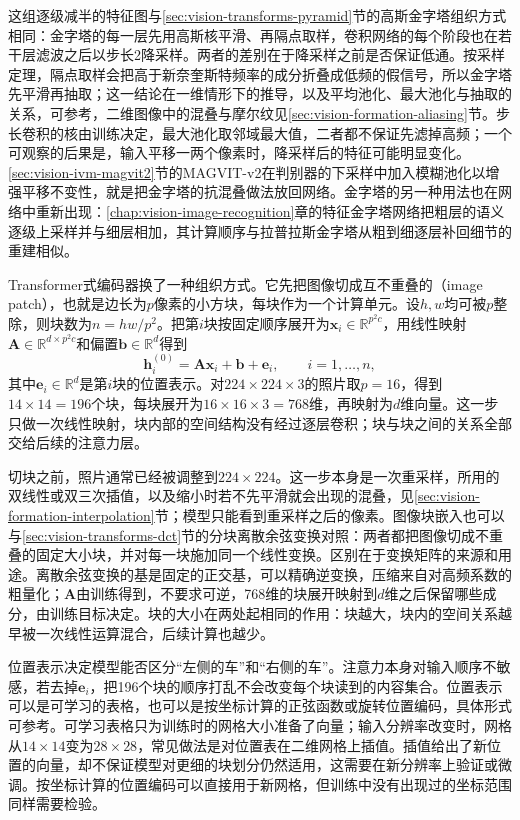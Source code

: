 这组逐级减半的特征图与\ref{sec:vision-transforms-pyramid}节的高斯金字塔组织方式相同：金字塔的每一层先用高斯核平滑、再隔点取样，卷积网络的每个阶段也在若干层滤波之后以步长2降采样。两者的差别在于降采样之前是否保证低通。按采样定理，隔点取样会把高于新奈奎斯特频率的成分折叠成低频的假信号，所以金字塔先平滑再抽取；这一结论在一维情形下的推导，以及平均池化、最大池化与抽取的关系，可参考，二维图像中的混叠与摩尔纹见\ref{sec:vision-formation-aliasing}节。步长卷积的核由训练决定，最大池化取邻域最大值，二者都不保证先滤掉高频；一个可观察的后果是，输入平移一两个像素时，降采样后的特征可能明显变化。\ref{sec:vision-ivm-magvit2}节的MAGVIT-v2在判别器的下采样中加入模糊池化以增强平移不变性，就是把金字塔的抗混叠做法放回网络。金字塔的另一种用法也在网络中重新出现：\ref{chap:vision-image-recognition}章的特征金字塔网络把粗层的语义逐级上采样并与细层相加，其计算顺序与拉普拉斯金字塔从粗到细逐层补回细节的重建相似。

Transformer式编码器换了一种组织方式。它先把图像切成互不重叠的（image patch），也就是边长为$p$像素的小方块，每块作为一个计算单元。设$h,w$均可被$p$整除，则块数为$n=hw/p^2$。把第$i$块按固定顺序展开为$\bm x_i\in\mathbb R^{p^2c}$，用线性映射$\bm A\in\mathbb R^{d\times p^2c}$和偏置$\bm b\in\mathbb R^{d}$得到
\begin{equation}
  \bm h_i^{(0)}=\bm A\bm x_i+\bm b+\bm e_i,
  \qquad i=1,\ldots,n,
  \label{eq:vision-ivm-patch-embedding}
\end{equation}
其中$\bm e_i\in\mathbb R^{d}$是第$i$块的位置表示。对$224\times224\times3$的照片取$p=16$，得到$14\times14=196$个块，每块展开为$16\times16\times3=768$维，再映射为$d$维向量。这一步只做一次线性映射，块内部的空间结构没有经过逐层卷积；块与块之间的关系全部交给后续的注意力层。

切块之前，照片通常已经被调整到$224\times224$。这一步本身是一次重采样，所用的双线性或双三次插值，以及缩小时若不先平滑就会出现的混叠，见\ref{sec:vision-formation-interpolation}节；模型只能看到重采样之后的像素。图像块嵌入也可以与\ref{sec:vision-transforms-dct}节的分块离散余弦变换对照：两者都把图像切成不重叠的固定大小块，并对每一块施加同一个线性变换。区别在于变换矩阵的来源和用途。离散余弦变换的基是固定的正交基，可以精确逆变换，压缩来自对高频系数的粗量化；$\bm A$由训练得到，不要求可逆，768维的块展开映射到$d$维之后保留哪些成分，由训练目标决定。块的大小在两处起相同的作用：块越大，块内的空间关系越早被一次线性运算混合，后续计算也越少。

位置表示决定模型能否区分“左侧的车”和“右侧的车”。注意力本身对输入顺序不敏感，若去掉$\bm e_i$，把196个块的顺序打乱不会改变每个块读到的内容集合。位置表示可以是可学习的表格，也可以是按坐标计算的正弦函数或旋转位置编码，具体形式可参考。可学习表格只为训练时的网格大小准备了向量；输入分辨率改变时，网格从$14\times14$变为$28\times28$，常见做法是对位置表在二维网格上插值。插值给出了新位置的向量，却不保证模型对更细的块划分仍然适用，这需要在新分辨率上验证或微调。按坐标计算的位置编码可以直接用于新网格，但训练中没有出现过的坐标范围同样需要检验。

